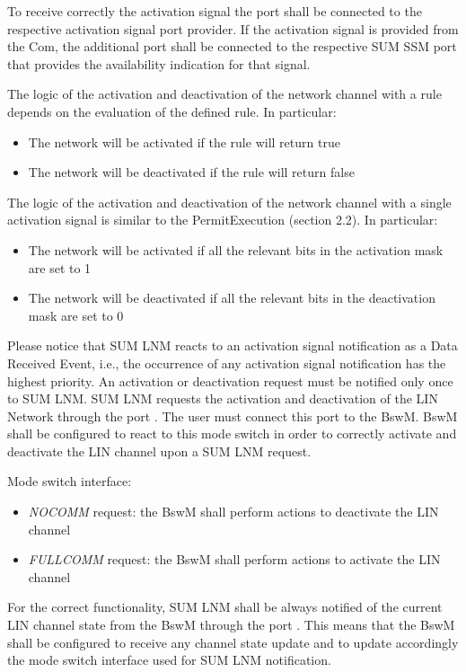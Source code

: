 To receive correctly the activation signal the port  shall be connected to the respective activation signal port provider. If the activation signal is provided from the Com, the additional port  shall be connected to the respective SUM SSM port that provides the availability indication for that signal.

The logic of the activation and deactivation of the network channel with a rule depends on the evaluation of the defined rule. In particular:
\begin{itemize}
\item The network will be activated if the rule will return true
\item The network will be deactivated if the rule will return false
\end{itemize}
The logic of the activation and deactivation of the network channel with a single activation signal is similar to the PermitExecution (section 2.2). In particular:
\begin{itemize}
\item The network will be activated if all the relevant bits in the activation mask are set to 1
\item The network will be deactivated if all the relevant bits in the deactivation mask are set to 0
\end{itemize}


Please notice that SUM LNM reacts to an activation signal notification as a Data Received Event, i.e., the occurrence of any activation signal notification has the highest priority. An activation or deactivation request must be notified only once to SUM LNM.
SUM LNM requests the activation and deactivation of the LIN Network through the port . The user must connect this port to the BswM. BswM shall be configured to react to this mode switch in order to correctly activate and deactivate the LIN channel upon a SUM LNM request.


Mode switch interface:
\begin{itemize}
\item \textit{NOCOMM} request: the BswM shall perform actions to deactivate the LIN channel
\item \textit{FULLCOMM} request: the BswM shall perform actions to activate the LIN channel
\end{itemize}


For the correct functionality, SUM LNM shall be always notified of the current LIN channel state from the BswM through the port . This means that the BswM shall be configured to receive any channel state update and to update accordingly the mode switch interface used for SUM LNM notification.


